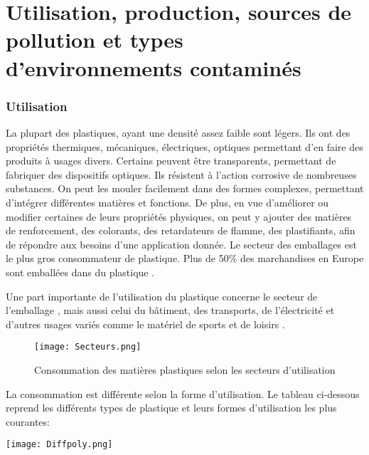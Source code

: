 \part{Utilisation, production, sources de pollution et types d'environnements contamin\'es}
\setcounter{section}{0}
\section{Utilisation}
\par{
La plupart des plastiques, ayant une densit\'e assez faible sont l\'egers. Ils ont des propri\'et\'es thermiques, m\'ecaniques, \'electriques, optiques permettant d'en faire des produits \`a usages divers. Certains peuvent \^etre transparents, permettant de fabriquer des dispositifs optiques. Ils r\'esistent \`a l'action corrosive de nombreuses substances. On peut les mouler facilement dans des formes complexes, permettant d'int\'egrer diff\'erentes mati\`eres et fonctions. De plus, en vue d'am\'eliorer ou modifier certaines de leurs propri\'et\'es physiques, on peut y ajouter des mati\`eres de renforcement, des colorants, des retardateurs de flamme, des plastifiants, afin de r\'epondre aux besoins d'une application donn\'ee. Le secteur des emballages est le plus gros consommateur de plastique. Plus de 50\% des marchandises en Europe sont emball\'ees dans du plastique {\citep{Plasticseurope2}}.
}
\par{
Une part importante de l'utilisation du plastique concerne le secteur de l'emballage , mais aussi celui du b\^atiment, des transports, de l'\'electricit\'e et d'autres usages vari\'es comme le mat\'eriel de sports et de loisirs {\citep{SCF}}.
}

\begin{figure}[h]
\centering
\texttt{[image: Secteurs.png]}
\caption{Consommation des mati\`eres plastiques selon les secteurs d'utilisation {\citep{SCF}}} 
\label{secteurs}
\end{figure}
\FloatBarrier

\par{
La consommation est diff\'erente selon la forme d'utilisation. Le tableau ci-dessous reprend les diff\'erents types de plastique et leurs formes d'utilisation les plus courantes:
}

\begin{table}[h]
\centering
\texttt{[image: Diffpoly.png]}
\caption{Les diff\'erents types de polym\`eres et leurs principales utilisations {\citep{Schafer2015}}} 
\label{diffpoly}
\end{table}
\FloatBarrier

